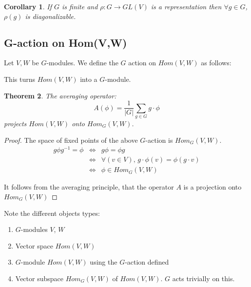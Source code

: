 \documentclass{sig-alternate}
\newtheorem{theorem}{Theorem}[section]
\newtheorem{corollary}[theorem]{Corollary}
\newenvironment{definition}[1][Definition]{\begin{trivlist}
\item[\hskip \labelsep {\bfseries #1}]}{\end{trivlist}}
\begin{document}
\begin{corollary}
If $G$ is finite and  $\rho: G\rightarrow GL(V)$ is a representation then $\forall g\in G$, $\rho(g)$ is diagonalizable.
\end{corollary}

\subsection{G-action on Hom(V,W)}
\begin{definition}
Let $V,W$ be $G$-modules. We define the $G$ action on $Hom(V,W)$ as follows:
\begin{center}
\end{center}
\end{definition}
This turns $Hom(V,W)$ into a $G$-module.
\begin{theorem}\label{thm:avgHom}
The averaging operator:
\[A(\phi) = \frac{1}{|G|}\sum_{g\in G}g\cdot\phi \]
projects $Hom(V,W)$ onto $Hom_G(V,W)$.
\end{theorem}
\begin{proof}
The space of fixed points of the above $G$-action is $Hom_G(V,W)$. 
\begin{eqnarray*}
g\phi g^{-1} = \phi &  \Longleftrightarrow & g\phi = \phi g \\
 & \Longleftrightarrow & \forall(v \in V)\mbox{, } g\cdot \phi(v) = \phi(g\cdot v) \\
 & \Longleftrightarrow & \phi \in Hom_G(V,W)
 \end{eqnarray*}

It follows from the averaging principle, that the operator $A$ is a projection onto $Hom_G(V,W)$
\end{proof}

Note the different objects types:
\begin{enumerate}
\itemsep0em
\item $G$-modules $V$, $W$
\item Vector space $Hom(V,W)$
\item $G$-module $Hom(V,W)$ using the $G$-action defined
\item Vector subspace $Hom_G(V,W)$ of $Hom(V,W)$. $G$ acts trivially on this.
\end{enumerate}
\end{document}
